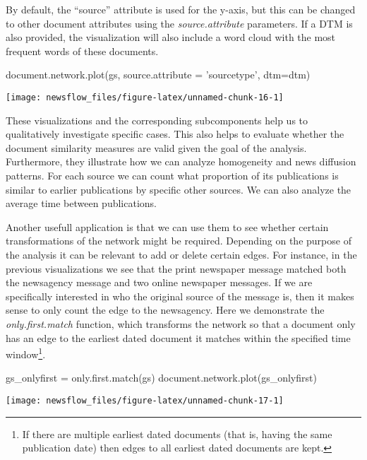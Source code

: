 By default, the ``source'' attribute is used for the y-axis, but this
can be changed to other document attributes using the
\emph{source.attribute} parameters. If a DTM is also provided, the
visualization will also include a word cloud with the most frequent
words of these documents.

\begin{Schunk}
\begin{Sinput}
document.network.plot(gs, source.attribute = 'sourcetype', dtm=dtm)
\end{Sinput}

\texttt{[image: newsflow\_files/figure-latex/unnamed-chunk-16-1]} \end{Schunk}

These visualizations and the corresponding subcomponents help us to
qualitatively investigate specific cases. This also helps to evaluate
whether the document similarity measures are valid given the goal of the
analysis. Furthermore, they illustrate how we can analyze homogeneity
and news diffusion patterns. For each source we can count what
proportion of its publications is similar to earlier publications by
specific other sources. We can also analyze the average time between
publications.

Another usefull application is that we can use them to see whether
certain transformations of the network might be required. Depending on
the purpose of the analysis it can be relevant to add or delete certain
edges. For instance, in the previous visualizations we see that the
print newspaper message matched both the newsagency message and two
online newspaper messages. If we are specifically interested in who the
original source of the message is, then it makes sense to only count the
edge to the newsagency. Here we demonstrate the \emph{only.first.match}
function, which transforms the network so that a document only has an
edge to the earliest dated document it matches within the specified time
window\footnote{If there are multiple earliest dated documents (that is,
  having the same publication date) then edges to all earliest dated
  documents are kept.}.

\begin{Schunk}
\begin{Sinput}
gs_onlyfirst = only.first.match(gs)
document.network.plot(gs_onlyfirst)
\end{Sinput}

\texttt{[image: newsflow\_files/figure-latex/unnamed-chunk-17-1]} \end{Schunk}

